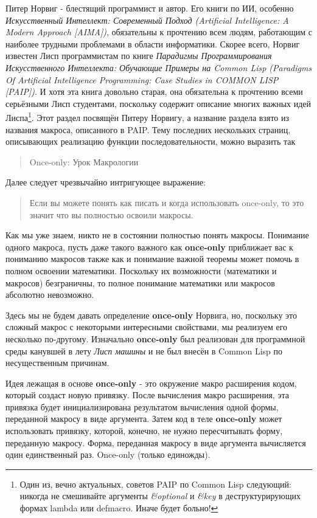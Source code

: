 Питер Норвиг - блестящий программист и автор. Его книги по ИИ, особенно \emph{Искусственный Интеллект: Современный Подход (Artificial Intelligence: A Modern Approach [AIMA])}, обязательны к прочтению всем людям, работающим с наиболее трудными проблемами в области информатики. Скорее всего, Норвиг известен Лисп программистам по книге \emph{Парадигмы Программирования Искусственного Интеллекта: Обучающие Примеры на Common Lisp {(Paradigms Of Artificial Intelligence Programming: Case Studies in COMMON LISP [PAIP])}}. И хотя эта книга довольно старая, она обязательна к прочтению всеми серьёзными Лисп студентами, поскольку содержит описание многих важных идей Лиспа\footnote{Один из, вечно актуальных, советов PAIP по Common Lisp следующий: никогда не смешивайте аргументы \emph{\&optional} и \emph{\&key} в деструктурирующих формах lambda или defmacro. Иначе будет больно!}. Этот раздел посвящён Питеру Норвигу, а название раздела взято из названия макроса, описанного в PAIP. Тему последних нескольких страниц, описывающих реализацию функции последовательности, можно выразить так

\begin{quote}
Once-only: Урок Макрологии
\end{quote}

Далее следует чрезвычайно интригующее выражение:

\begin{quote}
Если вы можете понять как писать и когда использовать once-only, то это значит что вы полностью освоили макросы.
\end{quote}

Как мы уже знаем, никто не в состоянии полностью понять макросы. Понимание одного макроса, пусть даже такого важного как \textbf{once-only} приближает вас к пониманию макросов также как и понимание важной теоремы может помочь в полном освоении математики. Поскольку их возможности (математики и макросов) безграничны, то полное понимание математики или макросов абсолютно невозможно.

Здесь мы не будем давать определение \textbf{once-only} Норвига, но, поскольку это сложный макрос с некоторыми интересными свойствами, мы реализуем его несколько по-другому. Изначально \textbf{once-only} был реализован для программной среды канувшей в лету \emph{Лисп машины} и не был внесён в Common Lisp по несущественным причинам.

Идея лежащая в основе \textbf{once-only} - это окружение макро расширения кодом, который создаст новую привязку. После вычисления макро расширения, эта привязка будет инициализирована результатом вычисления одной формы, переданной макросу в виде аргумента. Затем код в теле \textbf{once-only} может использовать привязку, которой, конечно, не нужно пересчитывать форму, переданную макросу. Форма, переданная макросу в виде аргумента вычисляется один единственный раз. Once-only (только единожды).


